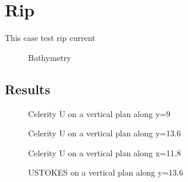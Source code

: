 \chapter{Rip}
This case test rip current
\begin{figure} [!h]
\centering
{}
 \caption{Bathymetry}
\label{figresRip0}
\end{figure}

\section{Results}
\begin{figure} [!h]
\centering
{}
 \caption{Celerity U on a vertical plan along y=9}
\label{figresRip1}
\end{figure}
\begin{figure} [!h]
\centering
{}
 \caption{Celerity U on a vertical plan along y=13.6}
\label{figresRip2}
\end{figure}
\begin{figure} [!h]
\centering
{}
 \caption{Celerity U on a vertical plan along x=11.8}
\label{figresRip1}
\end{figure}
\begin{figure} [!h]
\centering
{}
 \caption{USTOKES on a vertical plan along y=13.6}
\label{figresRip1}
\end{figure}


